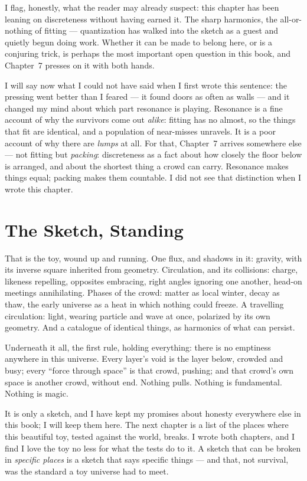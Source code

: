 \documentclass[fontsize=11pt,paper=a4,pagesize=auto,parskip=half-]{scrbook}
\begin{document}
I flag, honestly, what the reader may already suspect: this chapter has been leaning on discreteness without having earned it. The sharp harmonics, the all-or-nothing of fitting --- quantization has walked into the sketch as a guest and quietly begun doing work. Whether it can be made to belong here, or is a conjuring trick, is perhaps the most important open question in this book, and Chapter~7 presses on it with both hands.

I will say now what I could not have said when I first wrote this sentence: the pressing went better than I feared --- it found doors as often as walls --- and it changed my mind about which part resonance is playing. Resonance is a fine account of why the survivors come out \emph{alike}: fitting has no almost, so the things that fit are identical, and a population of near-misses unravels. It is a poor account of why there are \emph{lumps} at all. For that, Chapter~7 arrives somewhere else --- not fitting but \emph{packing}: discreteness as a fact about how closely the floor below is arranged, and about the shortest thing a crowd can carry. Resonance makes things equal; packing makes them countable. I did not see that distinction when I wrote this chapter.

\section{The Sketch, Standing}

That is the toy, wound up and running. One flux, and shadows in it: gravity, with its inverse square inherited from geometry. Circulation, and its collisions: charge, likeness repelling, opposites embracing, right angles ignoring one another, head-on meetings annihilating. Phases of the crowd: matter as local winter, decay as thaw, the early universe as a heat in which nothing could freeze. A travelling circulation: light, wearing particle and wave at once, polarized by its own geometry. And a catalogue of identical things, as harmonics of what can persist.

Underneath it all, the first rule, holding everything: there is no emptiness anywhere in this universe. Every layer's void is the layer below, crowded and busy; every ``force through space'' is that crowd, pushing; and that crowd's own space is another crowd, without end. Nothing pulls. Nothing is fundamental. Nothing is magic.

It is only a sketch, and I have kept my promises about honesty everywhere else in this book; I will keep them here. The next chapter is a list of the places where this beautiful toy, tested against the world, breaks. I wrote both chapters, and I find I love the toy no less for what the tests do to it. A sketch that can be broken in \emph{specific places} is a sketch that says specific things --- and that, not survival, was the standard a toy universe had to meet.
\end{document}
